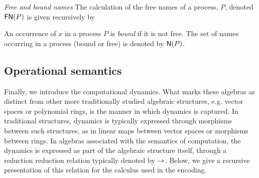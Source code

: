 
\begin{definition}
  \emph{Free and bound names} The calculation of the free names of a
  process, $P$, denoted $\mathsf{FN}(P)$ is given recursively by
  
  
  An occurrence of $x$ in a process $P$ is \textit{bound} if it is not
  free. The set of names occurring in a process (bound or free) is
  denoted by $\mathsf{N}(P)$.
\end{definition}

\subsection{Operational semantics}

Finally, we introduce the computational dynamics. What marks these
algebras as distinct from other more traditionally studied algebraic
structures, e.g. vector spaces or polynomial rings, is the manner in
which dynamics is captured. In traditional structures, dynamics is typically
expressed through morphisms between such structures, as in linear maps
between vector spaces or morphisms between rings. In algebras
associated with the semantics of computation, the dynamics is
expressed as part of the algebraic structure itself, through a
reduction reduction relation typically denoted by $\rightarrow$. Below, we
give a recursive presentation of this relation for the calculus used
in the encoding.

